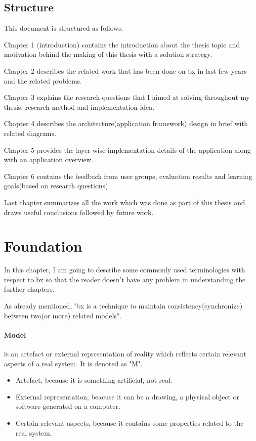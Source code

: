 \subsection{Structure}\label{subsec:structure}
This document is structured as follows: 

Chapter 1 (introduction) contains the introduction about the thesis topic and
motivation behind the making of this thesis with a solution strategy.

Chapter 2 describes the related work that has been done on bx in last few years and the related problems.

Chapter 3 explains the research questions that I aimed at solving throughout my thesis, research method and implementation idea.

Chapter 4 describes the architecture(application framework) design in brief with related diagrams.

Chapter 5 provides the layer-wise implementation details of the application along with an application overview.

Chapter 6 contains the feedback from user groups, evaluation results and learning goals(based on research questions).

Last chapter summarizes all the work which was done as part of this thesis and draws useful conclusions followed by future work.

\section{Foundation}\label{sec:foundation}
In this chapter, I am going to describe some commonly used terminologies with respect to bx so that the reader doesn't have any problem in understanding the further chapters.

As already mentioned, "bx is a technique to maintain consistency(synchronize) between two(or more) related models".

\paragraph{Model}is an artefact or external representation of reality which reflects certain relevant aspects of a real system. It is denoted as "M".
\begin{itemize}
\item {Artefact, because it is something artificial, not real.}
\item {External representation, beacuse it can be a drawing, a physical object or software generated on a computer.}
\item {Certain relevant aspects, because it contains some properties related to the real system.}
\end{itemize}
